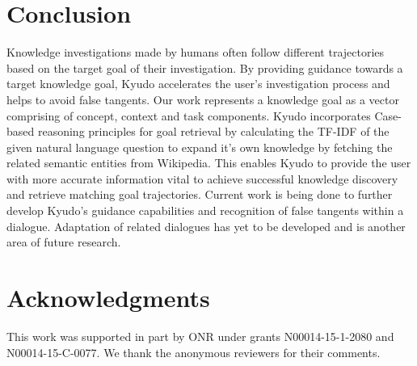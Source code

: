 \documentclass{llncs}
\begin{document}
\section{Conclusion}

Knowledge investigations made by humans often follow different trajectories based on the target goal of their investigation. By providing guidance towards a target knowledge goal, Kyudo accelerates the user’s investigation process and helps to avoid false tangents. Our work represents a knowledge goal as a vector comprising of concept, context and task components. Kyudo incorporates Case-based reasoning principles for goal retrieval by calculating the TF-IDF of the given natural language question to expand it's own knowledge by fetching the related semantic entities from Wikipedia. This enables Kyudo to provide the user with more accurate information vital to achieve successful knowledge discovery and retrieve matching goal trajectories. Current work is being done to further develop Kyudo's guidance capabilities and recognition of false tangents within a dialogue. Adaptation of related dialogues has yet to be developed and is another area of future research.

\section{Acknowledgments}
This work was supported in part by ONR under grants N00014-15-1-2080 and N00014-15-C-0077. We thank the anonymous reviewers for their comments.
\end{document}
